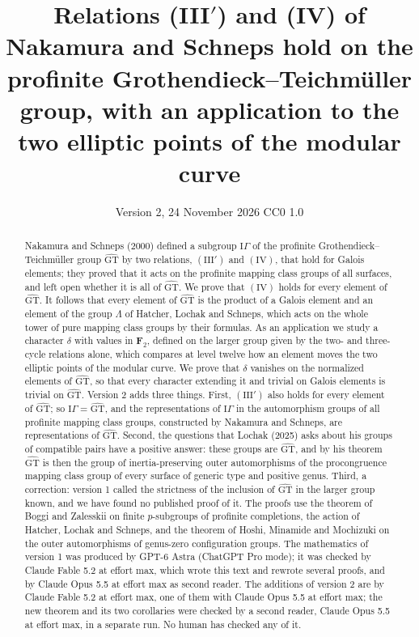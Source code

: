 \documentclass[11pt,a4paper]{article}
\title{Relations (III$'$) and (IV) of Nakamura and Schneps hold on the profinite Grothendieck--Teichm\"uller group,
with an application to the two elliptic points of the modular curve}
\author{}
\date{Version 2, 24 November 2026 \quad CC0 1.0}
\theoremstyle{plain}
\theoremstyle{definition}
\theoremstyle{remark}
\newcommand{\GT}{\widehat{\mathrm{GT}}}
\begin{document}
\maketitle

\begin{abstract}
\noindent
Nakamura and Schneps (2000) defined a subgroup $\mathrm{I}\Gamma$ of the profinite Grothendieck--Teichm\"uller group $\GT$ by two
relations, $(\mathrm{III}')$ and $(\mathrm{IV})$, that hold for Galois elements; they proved that it acts on the
profinite mapping class groups of all surfaces, and left open whether it is all of $\GT$. We prove that
$(\mathrm{IV})$ holds for every element of $\GT$. It follows that every element of $\GT$ is the product of a Galois
element and an element of the group $\Lambda$ of Hatcher, Lochak and Schneps, which acts on the whole tower of pure
mapping class groups by their formulas. As an application we study a character $\delta$ with values in
$\mathbf F_2$, defined on the larger group given by the two- and three-cycle relations alone, which compares at
level twelve how an element moves the two elliptic points of the modular curve. We prove that $\delta$ vanishes on
the normalized elements of $\GT$, so that every character extending it and trivial on Galois elements is trivial on
$\GT$. Version 2 adds three things. First, $(\mathrm{III}')$ also holds for every element of $\GT$; so
$\mathrm{I}\Gamma=\GT$, and the representations of $\mathrm{I}\Gamma$ in the automorphism groups of all profinite
mapping class groups, constructed by Nakamura and Schneps, are representations of $\GT$. Second, the questions that
Lochak (2025) asks about his groups of compatible pairs have a positive answer: these groups are $\GT$, and by his
theorem $\GT$ is then the group of inertia-preserving outer automorphisms of the procongruence mapping class group of
every surface of generic type and positive genus. Third, a correction: version 1 called the strictness of the
inclusion of $\GT$ in the larger group known, and we have found no published proof of it.
The proofs use the theorem of Boggi and Zalesskii on finite $p$-subgroups of profinite completions, the
action of Hatcher, Lochak and Schneps, and the theorem of Hoshi, Minamide and Mochizuki on the outer automorphisms
of genus-zero configuration groups. The mathematics of version 1 was produced by
GPT-6 Astra (ChatGPT Pro mode); it was checked by Claude Fable 5.2 at effort max, which wrote this text and rewrote
several proofs, and by Claude Opus 5.5 at effort max as second reader. The additions of version 2 are by Claude
Fable 5.2 at effort max, one of them with Claude Opus 5.5 at effort max; the new theorem and its two corollaries
were checked by a second reader, Claude Opus 5.5 at effort max, in a separate run. No human has checked any of
it.
\end{abstract}
\end{document}
